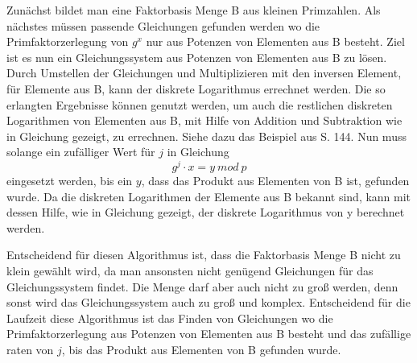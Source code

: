 		Zunächst bildet man eine Faktorbasis Menge B aus kleinen Primzahlen. Als nächstes müssen passende Gleichungen gefunden werden wo die Primfaktorzerlegung von $g^x$ nur aus Potenzen von Elementen aus B besteht. Ziel ist es nun ein Gleichungssystem aus Potenzen von Elementen aus B zu lösen. Durch Umstellen der Gleichungen und Multiplizieren mit den inversen Element, für Elemente aus B, kann der diskrete Logarithmus errechnet werden. Die so erlangten Ergebnisse können genutzt werden, um auch die restlichen diskreten Logarithmen von Elementen aus B, mit Hilfe von Addition und Subtraktion wie in Gleichung  gezeigt, zu errechnen. Siehe dazu das Beispiel aus \cite{Elliptic:Curves:Number:Theory:and:Cryptography} S. 144. Nun muss solange ein zufälliger Wert für $j$ in Gleichung
		\begin{equation}
			g^j \cdot x = y~mod~p
			\label{Gleichung Diskreten Logarithmus Gleichung 2}
		\end{equation}
		eingesetzt werden, bis ein $y$, dass das Produkt aus Elementen von B ist, gefunden wurde. Da die diskreten Logarithmen der Elemente aus B bekannt sind, kann mit dessen Hilfe, wie in Gleichung  gezeigt, der diskrete Logarithmus von y berechnet werden.
		
		Entscheidend für diesen Algorithmus ist, dass die Faktorbasis Menge B nicht zu klein gewählt wird, da man ansonsten nicht genügend Gleichungen für das Gleichungssystem findet. Die Menge darf aber auch nicht zu groß werden, denn sonst wird das Gleichungssystem auch zu groß und komplex. Entscheidend für die Laufzeit diese Algorithmus ist das Finden von Gleichungen wo die Primfaktorzerlegung aus Potenzen von Elementen aus B besteht und das zufällige raten von $j$, bis das Produkt aus Elementen von B gefunden wurde.